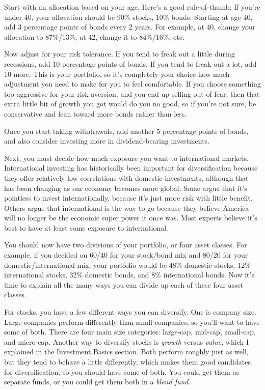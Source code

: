 Start with an allocation based on your age. Here's a good rule-of-thumb: If you're under 40, your allocation should be 90\% stocks, 10\% bonds. Starting at age 40, add 3 percentage points of bonds every 2 years. For example, at 40, change your allocation to 87\%/13\%, at 42, change it to 84\%/16\%, etc.

Now adjust for your risk tolerance. If you tend to freak out a little during recessions, add 10 percentage points of bonds. If you tend to freak out a lot, add 10 more. This is your portfolio, so it's completely your choice how much adjustment you need to make for you to feel comfortable. If you choose something too aggressive for your risk aversion, and you end up selling out of fear, then that extra little bit of growth you got would do you no good, so if you're not sure, be conservative and lean toward more bonds rather than less.

Once you start taking withdrawals, add another 5 percentage points of bonds, and also consider investing more in dividend-bearing investments.

Next, you must decide how much exposure you want to international markets. International investing has historically been important for diversification because they offer relatively low correlations with domestic investments, although that has been changing as our economy becomes more global. Some argue that it's pointless to invest internationally, because it's just more risk with little benefit. Others argue that international is the way to go because they believe America will no longer be the economic super power it once was. Most experts believe it's best to have at least some exposure to international.

You should now have two divisions of your portfolio, or four asset classes. For example, if you decided on 60/40 for your stock/bond mix and 80/20 for your domestic/international mix, your portfolio would be 48\% domestic stocks, 12\% international stocks, 32\% domestic bonds, and 8\% international bonds. Now it's time to explain all the many ways you can divide up each of these four asset classes.

For stocks, you have a few different ways you can diversify. One is company size. Large companies perform differently than small companies, so you'll want to have some of both. There are four main size categories: large-cap, mid-cap, small-cap, and micro-cap. Another way to diversify stocks is \emph{growth} versus \emph{value,} which I explained in the Investment Basics section. Both perform roughly just as well, but they tend to behave a little differently, which makes them good candidates for diversification, so you should have some of both. You could get them as separate funds, or you could get them both in a \emph{blend fund.}


